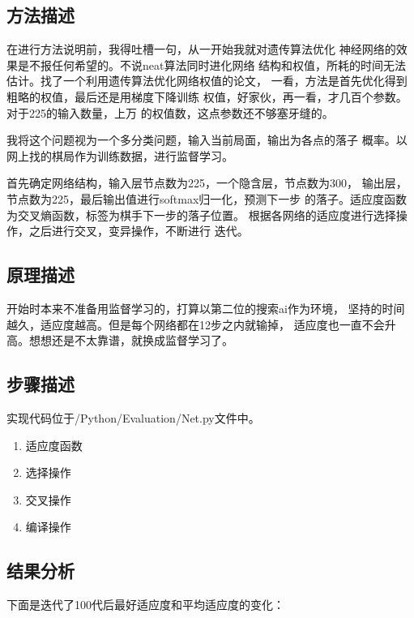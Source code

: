 \documentclass[UTF8]{article}
\begin{document}
\subsection{方法描述}

在进行方法说明前，我得吐槽一句，从一开始我就对遗传算法优化
神经网络的效果是不报任何希望的。不说neat算法同时进化网络
结构和权值，所耗的时间无法估计。找了一个利用遗传算法优化网络权值的论文，
一看，方法是首先优化得到粗略的权值，最后还是用梯度下降训练
权值，好家伙，再一看，才几百个参数。对于225的输入数量，上万
的权值数，这点参数还不够塞牙缝的。

我将这个问题视为一个多分类问题，输入当前局面，输出为各点的落子
概率。以网上找的棋局作为训练数据，进行监督学习。

首先确定网络结构，输入层节点数为225，一个隐含层，节点数为300，
输出层，节点数为225，最后输出值进行softmax归一化，预测下一步
的落子。适应度函数为交叉熵函数，标签为棋手下一步的落子位置。
根据各网络的适应度进行选择操作，之后进行交叉，变异操作，不断进行
迭代。

\subsection{原理描述}

开始时本来不准备用监督学习的，打算以第二位的搜索ai作为环境，
坚持的时间越久，适应度越高。但是每个网络都在12步之内就输掉，
适应度也一直不会升高。想想还是不太靠谱，就换成监督学习了。



\subsection{步骤描述}

实现代码位于/Python/Evaluation/Net.py文件中。

\begin{enumerate}
    \item 适应度函数
    \item 选择操作
    \item 交叉操作
    \item 编译操作

\end{enumerate}

\subsection{结果分析}

下面是迭代了100代后最好适应度和平均适应度的变化：
\end{document}

